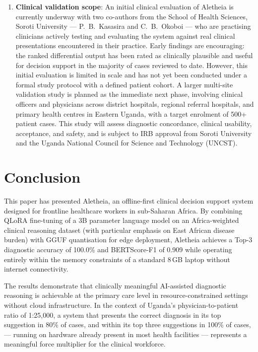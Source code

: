 \documentclass[journal]{IEEEtran}
\begin{document}
\begin{enumerate}
  \item \textbf{Clinical validation scope}: An initial clinical
        evaluation of Aletheia is currently underway with two
        co-authors from the School of Health Sciences, Soroti
        University --- P.~B.~Kasasira and C.~B.~Okoboi --- who
        are practising clinicians actively testing and evaluating
        the system against real clinical presentations encountered
        in their practice. Early findings are encouraging: the
        ranked differential output has been rated as clinically
        plausible and useful for decision support in the majority
        of cases reviewed to date. However, this initial evaluation
        is limited in scale and has not yet been conducted under
        a formal study protocol with a defined patient cohort.
        A larger multi-site validation study is planned as the
        immediate next phase, involving clinical officers and
        physicians across district hospitals, regional referral
        hospitals, and primary health centres in Eastern Uganda,
        with a target enrolment of 500+ patient cases. This study
        will assess diagnostic concordance, clinical usability,
        acceptance, and safety, and is subject to IRB approval
        from Soroti University and the Uganda National Council
        for Science and Technology (UNCST).
\end{enumerate}


\section{Conclusion}
\label{sec:conclusion}

This paper has presented Aletheia, an offline-first clinical
decision support system designed for frontline healthcare workers
in sub-Saharan Africa. By combining QLoRA fine-tuning of a 3B
parameter language model on an Africa-weighted clinical reasoning dataset
(with particular emphasis on East African disease burden) with GGUF quantisation for edge deployment,
Aletheia achieves a Top-3 diagnostic accuracy of 100.0\% and
BERTScore-F1 of 0.909 while operating entirely within the memory
constraints of a standard 8\,GB laptop without internet
connectivity.

The results demonstrate that clinically meaningful AI-assisted
diagnostic reasoning is achievable at the primary care level in
resource-constrained settings without cloud infrastructure. In
the context of Uganda's physician-to-patient ratio of 1:25{,}000,
a system that presents the correct diagnosis in its top suggestion
in 80\% of cases, and within its top three suggestions in 100\% of cases, --- running on hardware already present in most
health facilities --- represents a meaningful force multiplier for
the clinical workforce.
\end{document}

